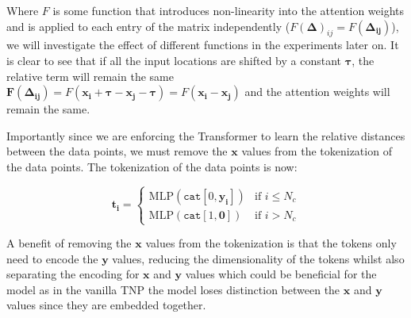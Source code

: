 \documentclass[../../main.tex]{subfiles}
\begin{document}
Where $F$ is some function that introduces non-linearity into the attention weights and is applied to each entry of the matrix independently ($F(\bm{\Delta})_{ij} = F(\bm{\Delta_{ij}})$), we will investigate the effect of different functions in the experiments later on. It is clear to see that if all the input locations are shifted by a constant $\bm{\tau}$, the relative term will remain the same $\bm{F(\Delta_{ij})} = F(\bm{x_i} + \bm{\tau} - \bm{x_j} - \bm{\tau}) = F(\bm{x_i} - \bm{x_j})$ and the attention weights will remain the same.

Importantly since we are enforcing the Transformer to learn the relative distances between the data points, we must remove the $\bm{x}$ values from the tokenization of the data points. The tokenization of the data points is now:

\[
	\bm{t_i} = \begin{cases}
		\text{MLP}(\texttt{cat}[0, \bm{y_i}]) & \text{if } i \leq N_c \\
		\text{MLP}(\texttt{cat}[1, \bm{ 0}]) & \text{if } i > N_c
	\end{cases}
\]




A benefit of removing the $\bm{x}$ values from the tokenization is that the tokens only need to encode the $\bm{y}$ values, reducing the dimensionality of the tokens whilst also separating the encoding for $\bm{x}$ and $\bm{y}$ values which could be beneficial for the model as in the vanilla TNP the model loses distinction between the $\bm{x}$ and $\bm{y}$ values since they are embedded together.









\end{document}
